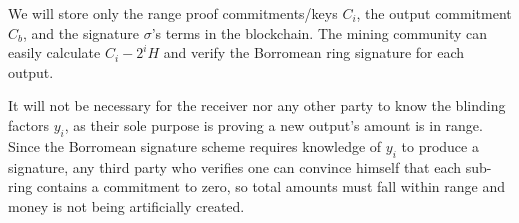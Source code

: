 We will store only the range proof commitments/keys $C_i$, the output commitment $C_b$, and the signature $\sigma$'s terms in the blockchain. The mining community can easily calculate $C_i - 2^i H$ and verify the Borromean ring signature for each output.

It will not be necessary for the receiver nor any other party to know the blinding factors $y_i$, as their sole purpose is proving a new output's amount is in range. 
\\

Since the Borromean signature scheme requires knowledge of $y_i$ to produce a signature, any third party who verifies one can convince himself that each sub-ring contains a commitment to zero, so total amounts must fall within range and money is not being artificially created.

